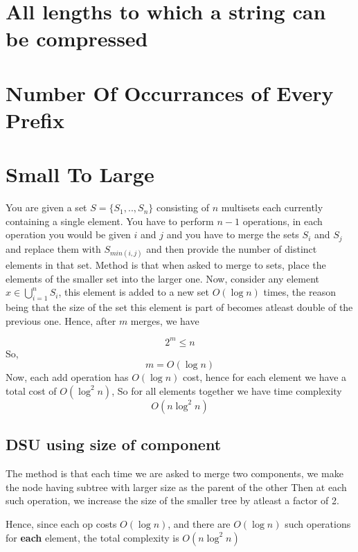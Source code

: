 \documentclass{article}
\begin{document}
    \section{All lengths to which a string can be compressed}

    \section{Number Of Occurrances of Every Prefix}

    \section{Small To Large}

    You are given a set $S = \{S_1, .., S_n\}$ consisting of $n$ multisets
    each currently containing a single element. You have to perform $n - 1$
    operations, in each operation you would be given $i$ and $j$ and you 
    have to merge the sets $S_i$ and $S_j$ and replace them with $S_{min(i,j)}$
    and then provide the number of distinct elements in that set.
    Method is that when asked to merge to sets, place the elements of the smaller
    set into the larger one.
    Now, consider any element $x \in \bigcup_{i = 1}^{n}S_i$, this element is
    added to a new set $O(\log n)$ times, the reason being that the size of the
    set this element is part of becomes atleast double of the previous one.
    Hence, after $m$ merges, we have

    \[
        2^m \leq n
    \]
    So, 
    \[
        m = O(\log n)
    \]
    Now, each add operation has $O(\log n)$ cost, hence for each element we
    have a total cost of $O(\log^2n)$, So for all elements together we
    have time complexity
    \[
        O(n \log^2n)
    \]

    \subsection{DSU using size of component}

    The method is that each time we are asked to merge two components, we
    make the node having subtree with larger size as the parent of the other
    Then at each such operation, we increase the size of the smaller tree
    by atleast a factor of 2.
    
    Hence, since each op costs $O(\log n)$, and there are $O(\log n)$
    such operations for \textbf{each} element, the total complexity is
    $O(n \log^2n)$
\end{document}
